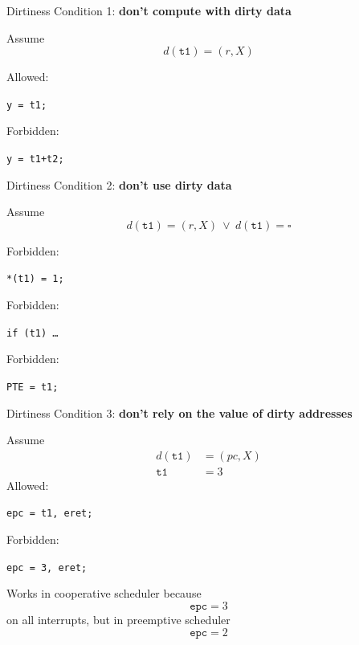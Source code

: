 \documentclass{beamer}
\begin{document}
\begin{frame} 
Dirtiness Condition 1: \textbf{don't compute with dirty data}

Assume
\[ d(\texttt{t1}) = (r,X) \]

Allowed:
\begin{center}\texttt{y = t1;}\end{center} 

Forbidden:
\begin{center}\texttt{y = t1+t2;}\end{center} 
\end{frame}

\begin{frame} 
Dirtiness Condition 2: \textbf{don't use dirty data}

Assume \[ d(\texttt{t1}) = (r,X) \ \lor \ d(\texttt{t1}) = \square \]

Forbidden:
\begin{center}\texttt{*(t1) = 1;}\end{center} 

Forbidden:
\begin{center}\texttt{if (t1) \ldots}\end{center} 

Forbidden:
\begin{center}\texttt{PTE = t1;}\end{center} 
\end{frame}

\begin{frame} 
Dirtiness Condition 3: \textbf{don't rely on the value of dirty addresses}

Assume 
\begin{align*} d(\texttt{t1}) &= (pc,X) 
\\
\texttt{t1} &= 3
\end{align*}
Allowed:
\begin{center}\texttt{epc = t1, eret;}\end{center} 

Forbidden:
\begin{center}\texttt{epc = 3, eret;}\end{center} 
\end{frame} 

\begin{frame} 

Works in cooperative scheduler because 
\[ \texttt{epc} = 3 \]
on all interrupts, but in preemptive scheduler
\[ \texttt{epc} = 2 \]
\end{frame}
\end{document}
